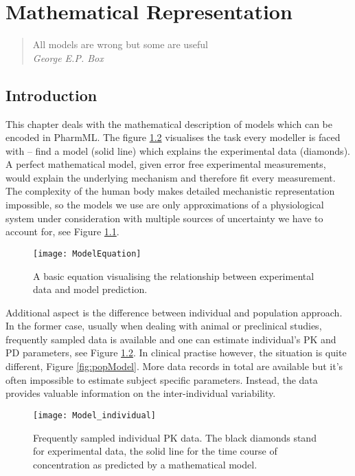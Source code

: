 \chapter{Mathematical Representation}
\label{chap:mathsdefn}

\begin{quote}
{\small
All models are wrong but some are useful\\
\textit{George E.P. Box} }
\end{quote}

\section{Introduction}
This chapter deals with the mathematical description of models which can be encoded in PharmML. The figure 
\ref{fig:indivModel} visualises the task every modeller is faced with -- find a model (solid line) which explains the experimental data (diamonds). A perfect mathematical model, given error free experimental measurements, would explain the underlying mechanism and therefore fit every measurement. The complexity of the human body makes detailed mechanistic representation impossible, so the models we use are only approximations of a physiological system under consideration with multiple sources of uncertainty we have to account for, see Figure \ref{fig:basicEquation}.\\
%
\begin{figure}[htbp]
\centering
 \texttt{[image: ModelEquation]}
\caption{A basic equation visualising the relationship between experimental data and model prediction.}
\label{fig:basicEquation}
\end{figure}
Additional aspect is the difference between individual and population approach. In the former case, usually when dealing with animal or preclinical studies, frequently sampled data is available and one can estimate individual's PK and PD parameters, see Figure \ref{fig:indivModel}. In clinical practise however, the situation is quite different, Figure \ref{fig:popModel}. More data records in total are available but it's often impossible to estimate subject specific parameters. Instead, the data provides valuable information on the inter-individual variability. 
\begin{figure}[htbp]
\centering
 \texttt{[image: Model\_individual]}
\caption{Frequently sampled individual PK data. The black diamonds stand for experimental data, the solid line for the time course of concentration as predicted by a mathematical model. }
\label{fig:indivModel}
\end{figure}

